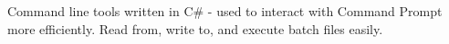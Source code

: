 Command line tools written in C\# -\/ used to interact with Command Prompt more efficiently. Read from, write to, and execute batch files easily. 